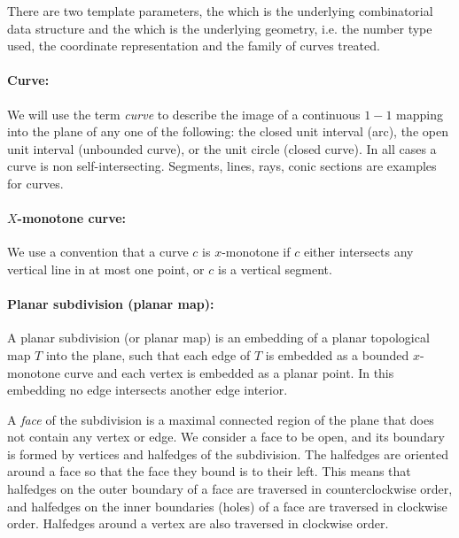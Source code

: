    There are two template parameters, the  which is the
   underlying combinatorial data structure and the  which
   is the underlying geometry, i.e. the number type used, the
   coordinate representation and the family of curves treated.

\paragraph{Curve:}
We will use the term {\it curve} to describe the image of a continuous
$1\!\!-\!\!1$ mapping into the plane of any one of the following: the
closed unit interval (arc), the open unit interval (unbounded curve),
or the unit circle (closed curve). In all cases a curve is non
self-intersecting. Segments, lines, rays, conic sections are examples for curves.

\paragraph{$X$-monotone curve:}
We
use a convention
that a curve $c$ is $x$-monotone if $c$ either intersects 
any vertical line in at most one point, or $c$ is a vertical
segment. 

\paragraph{Planar subdivision (planar map):}
A planar subdivision (or planar map) is an embedding of a planar 
topological map $T$ 
into the plane, such that each edge of $T$ is embedded as a
bounded $x$-monotone curve and each vertex is embedded as a planar point.
In this embedding no
edge intersects another edge interior.

A {\em face} of the subdivision is a maximal connected region of the
plane that does not contain any vertex or edge. 
We consider a face to be open, and its boundary is
formed by vertices and halfedges of the subdivision.
The halfedges are oriented around a face so that the face they bound
is to their left. This means that halfedges on the outer boundary
of a face are traversed in counterclockwise order, and halfedges on the inner
boundaries (holes) of a face are traversed in clockwise order. Halfedges 
around a vertex are also traversed in clockwise order. 

